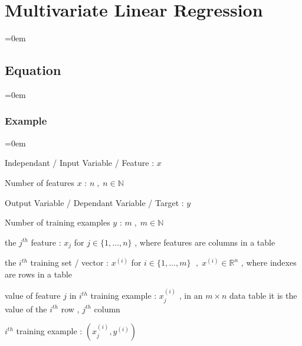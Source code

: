 
\usepackage{cancel} %


%

\onecolumn


\section{Multivariate Linear Regression}
\label{sec:multivariate_linear_regression}
\parindent=0em

\subsection{Equation}
\label{ssec:equation}
\parindent=0em

\subsubsection{Example}
\label{sssec:example}
\parindent=0em


 Independant / Input Variable / Feature : $ x\; $ 

 Number of features $x$ : $ n\; , \; n \in \mathbb{N} $ 

 Output Variable / Dependant Variable / Target : $ y\; $ 

 Number of training examples $y$ : $ m  \; , \; m \in \mathbb{N} $ 

  the $j^{th}$ feature : $ x_{j} $ for $ j \in \{1 , \ldots , n\} $ , where features are columns in a table

  the $i^{th}$ training set / vector : $x^{(i)}$  for $ i \in \{1 , \ldots , m\} $ $\; , \;  x^{(i)} \in \mathbb{R}^{n} $
 , where indexes are rows in a table

  value of feature $j$ in $i^{th}$ training example : $ x_{j}^{(i)} $ , 
 in an $ m \times n$ data table it is the value of the $i^{th}$ row , $j^{th}$ column 

 $i^{th}$ training example : $ ( x_{j}^{(i)} , y^{(i)} ) $ \\

